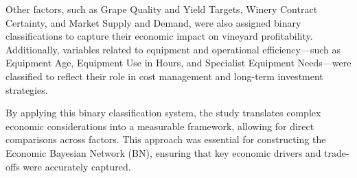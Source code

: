 \documentclass{article}
\begin{document}
Other factors, such as Grape Quality and Yield Targets, Winery Contract Certainty, and Market Supply and Demand, were also assigned binary classifications to capture their economic impact on vineyard profitability. Additionally, variables related to equipment and operational efficiency—such as Equipment Age, Equipment Use in Hours, and Specialist Equipment Needs—were classified to reflect their role in cost management and long-term investment strategies.

By applying this binary classification system, the study translates complex economic considerations into a measurable framework, allowing for direct comparisons across factors. This approach was essential for constructing the Economic Bayesian Network (BN), ensuring that key economic drivers and trade-offs were accurately captured.
\end{document}

